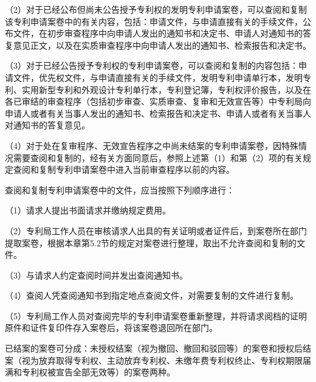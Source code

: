 {\setlength{\parindent}{17.1bp}（2）对于已经公布但尚未公告授予专利权的发明专利申请案卷，可以查阅和复制该专利申请案卷中的有关内容，包括：申请文件，与申请直接有关的手续文件，公布文件，在初步审查程序中向申请人发出的通知书和决定书、申请人对通知书的答复意见正文，以及在实质审查程序中向申请人发出的通知书、检索报告和决定书。\par}

{\setlength{\parindent}{17.1bp}（3）对于已经公告授予专利权的专利申请案卷，可以查阅和复制的内容包括：申请文件，优先权文件，与申请直接有关的手续文件，发明专利申请单行本，发明专利、实用新型专利和外观设计专利单行本，专利登记簿，专利权评价报告，以及在各已审结的审查程序（包括初步审查、实质审查、复审和无效宣告等）中专利局向申请人或者有关当事人发出的通知书、检索报告和决定书、申请人或者有关当事人对通知书的答复意见。\par}

{\setlength{\parindent}{17.1bp}（4）对于处在复审程序、无效宣告程序之中尚未结案的专利申请案卷，因特殊情况需要查阅和复制的，经有关方面同意后，参照上述第（1）和第（2）项的有关规定查阅和复制专利申请案卷中进入当前审查程序以前的内容。\par}

查阅和复制专利申请案卷中的文件，应当按照下列顺序进行：

{\setlength{\parindent}{17.1bp}（1）请求人提出书面请求并缴纳规定费用。\par}

{\setlength{\parindent}{17.1bp}（2）专利局工作人员在审核请求人出具的有关证明或者证件后，到案卷所在部门提取案卷，根据本章第5.2节的规定对案卷进行整理，取出不允许查阅和复制的文件。\par}

{\setlength{\parindent}{17.1bp}（3）与请求人约定查阅时间并发出查阅通知书。\par}

{\setlength{\parindent}{17.1bp}（4）查阅人凭查阅通知书到指定地点查阅文件，对需要复制的文件进行复制。\par}

{\setlength{\parindent}{17.1bp}（5）专利局工作人员对查阅完毕的专利申请案卷重新整理，并将请求阅档的证明原件和证件复印件存入案卷后，将该案卷退回所在部门。\par}

已结案的案卷可分成：未授权结案（视为撤回、撤回和驳回等）的案卷和授权后结案（视为放弃取得专利权、主动放弃专利权、未缴年费专利权终止、专利权期限届满和专利权被宣告全部无效等）的案卷两种。

